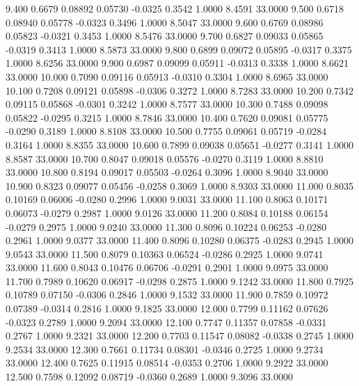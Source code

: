    9.400   0.6679   0.08892   0.05730  -0.0325   0.3542   1.0000   8.4591  33.0000
   9.500   0.6718   0.08940   0.05778  -0.0323   0.3496   1.0000   8.5047  33.0000
   9.600   0.6769   0.08986   0.05823  -0.0321   0.3453   1.0000   8.5476  33.0000
   9.700   0.6827   0.09033   0.05865  -0.0319   0.3413   1.0000   8.5873  33.0000
   9.800   0.6899   0.09072   0.05895  -0.0317   0.3375   1.0000   8.6256  33.0000
   9.900   0.6987   0.09099   0.05911  -0.0313   0.3338   1.0000   8.6621  33.0000
  10.000   0.7090   0.09116   0.05913  -0.0310   0.3304   1.0000   8.6965  33.0000
  10.100   0.7208   0.09121   0.05898  -0.0306   0.3272   1.0000   8.7283  33.0000
  10.200   0.7342   0.09115   0.05868  -0.0301   0.3242   1.0000   8.7577  33.0000
  10.300   0.7488   0.09098   0.05822  -0.0295   0.3215   1.0000   8.7846  33.0000
  10.400   0.7620   0.09081   0.05775  -0.0290   0.3189   1.0000   8.8108  33.0000
  10.500   0.7755   0.09061   0.05719  -0.0284   0.3164   1.0000   8.8355  33.0000
  10.600   0.7899   0.09038   0.05651  -0.0277   0.3141   1.0000   8.8587  33.0000
  10.700   0.8047   0.09018   0.05576  -0.0270   0.3119   1.0000   8.8810  33.0000
  10.800   0.8194   0.09017   0.05503  -0.0264   0.3096   1.0000   8.9040  33.0000
  10.900   0.8323   0.09077   0.05456  -0.0258   0.3069   1.0000   8.9303  33.0000
  11.000   0.8035   0.10169   0.06006  -0.0280   0.2996   1.0000   9.0031  33.0000
  11.100   0.8063   0.10171   0.06073  -0.0279   0.2987   1.0000   9.0126  33.0000
  11.200   0.8084   0.10188   0.06154  -0.0279   0.2975   1.0000   9.0240  33.0000
  11.300   0.8096   0.10224   0.06253  -0.0280   0.2961   1.0000   9.0377  33.0000
  11.400   0.8096   0.10280   0.06375  -0.0283   0.2945   1.0000   9.0543  33.0000
  11.500   0.8079   0.10363   0.06524  -0.0286   0.2925   1.0000   9.0741  33.0000
  11.600   0.8043   0.10476   0.06706  -0.0291   0.2901   1.0000   9.0975  33.0000
  11.700   0.7989   0.10620   0.06917  -0.0298   0.2875   1.0000   9.1242  33.0000
  11.800   0.7925   0.10789   0.07150  -0.0306   0.2846   1.0000   9.1532  33.0000
  11.900   0.7859   0.10972   0.07389  -0.0314   0.2816   1.0000   9.1825  33.0000
  12.000   0.7799   0.11162   0.07626  -0.0323   0.2789   1.0000   9.2094  33.0000
  12.100   0.7747   0.11357   0.07858  -0.0331   0.2767   1.0000   9.2321  33.0000
  12.200   0.7703   0.11547   0.08082  -0.0338   0.2745   1.0000   9.2534  33.0000
  12.300   0.7661   0.11734   0.08301  -0.0346   0.2725   1.0000   9.2734  33.0000
  12.400   0.7625   0.11915   0.08514  -0.0353   0.2706   1.0000   9.2922  33.0000
  12.500   0.7598   0.12092   0.08719  -0.0360   0.2689   1.0000   9.3096  33.0000
